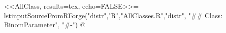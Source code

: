 <<AllClass, results=tex, echo=FALSE>>=
lstinputSourceFromRForge("distr","R","AllClasses.R","distr",
                     "## Class: BinomParameter", "#-")
@
